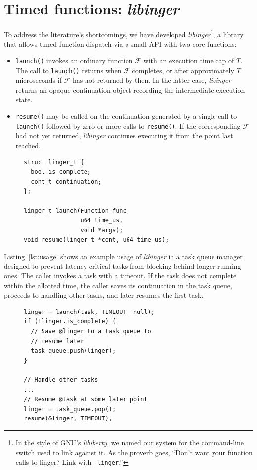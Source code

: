 \section{Timed functions: \textit{libinger}}
\label{sec:libinger}

To address the literature's shortcomings, we have developed
\textit{libinger}\footnote{In the style of GNU's \textit{libiberty}, we named our
system for the command-line switch used to link against it.  As the proverb goes,
``Don't want your function calls to linger?  Link with \texttt{-linger}.''},
a library that allows timed function dispatch via a small API with
two core functions:
\begin{itemize}
\item \texttt{launch()} invokes an ordinary function $\mathcal{F}$ with an
execution time cap of $T$.  The call to \texttt{launch()} returns when $\mathcal{F}$
completes, or after approximately $T$ microseconds if $\mathcal{F}$ has not returned
by then.  In the latter case, \textit{libinger} returns an opaque continuation
object recording the intermediate execution state.
\item \texttt{resume()} may be called on the continuation generated by a single call
to \texttt{launch()} followed by zero or more calls to \texttt{resume()}.  If the
corresponding $\mathcal{F}$ had not yet returned, \textit{libinger} continues
executing it from the point last reached.
\end{itemize}

\begin{figure}
\begin{lstlisting}[label=lst:ingerapi,caption=Preemptible functions core interface]
struct linger_t {
  bool is_complete;
  cont_t continuation;
};

linger_t launch(Function func,
                u64 time_us,
                void *args);
void resume(linger_t *cont, u64 time_us);
\end{lstlisting}
\end{figure}

Listing~\ref{lst:usage} shows an example usage of \textit{libinger}
in a task queue manager designed to prevent latency-critical tasks from blocking
behind longer-running
ones. The caller invokes a task with a timeout. If the task does not complete
within the allotted time, the caller saves its continuation in the task queue,
proceeds to handling other tasks, and later resumes the first task.

\begin{figure}
\begin{lstlisting}[label=lst:usage, caption=Preemptible function usage example]
linger = launch(task, TIMEOUT, null);
if (!linger.is_complete) {
  // Save @linger to a task queue to
  // resume later
  task_queue.push(linger);
}

// Handle other tasks
...
// Resume @task at some later point
linger = task_queue.pop();
resume(&linger, TIMEOUT);
\end{lstlisting}
\end{figure}

